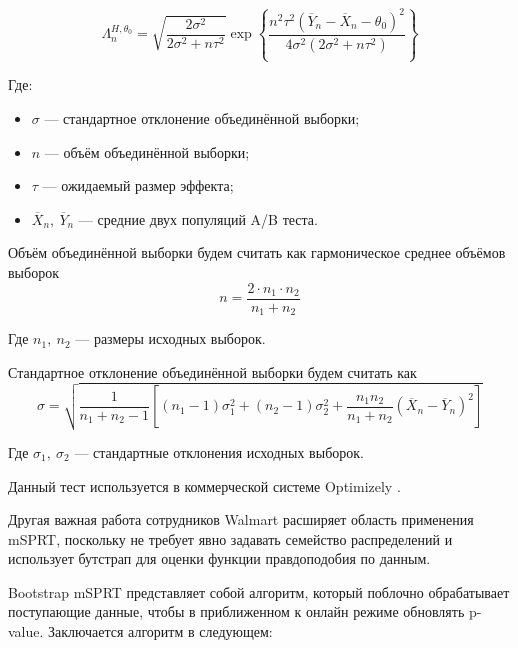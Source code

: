 \documentclass[../document.tex]{subfiles}
\begin{document}
	\begin{equation}
		\Lambda_{n}^{H,\theta_0} = \sqrt{\frac{2\sigma^2}{2\sigma^2 +n\tau^2}} \exp\left\{\frac{n^2\tau^2 (\overline{Y}_n-\overline{X}_n-\theta_0)^2}{4\sigma^2(2\sigma^2+n\tau^2)}\right\}
	\end{equation}
	\par Где:
	\begin{itemize}
		\item $\sigma$ --- стандартное отклонение объединённой выборки;
		\item $n$ --- объём объединённой выборки;
		\item $\tau$ --- ожидаемый размер эффекта;
		\item $\overline{X}_n,\ \overline{Y}_n$ --- средние двух популяций A/B теста.
	\end{itemize}
	\par Объём объединённой выборки будем считать как гармоническое среднее объёмов выборок \cite{welch_robust}
	\begin{equation}
		n=\frac{2\cdot n_1\cdot n_2}{n_1+n_2}
	\end{equation}
	\par Где $n_1,\ n_2$ --- размеры исходных выборок.
	\par Стандартное отклонение объединённой выборки будем считать как \cite{neil_sampling}
	\begin{equation}
		\sigma = \sqrt{\frac{1}{n_1+n_2-1}\left[(n_1-1)\sigma_1^2+(n_2-1)\sigma_2^2 +\frac{n_1 n_2}{n_1+n_2}(\overline{X}_n - \overline{Y}_n)^2\right]}
	\end{equation}
	\par Где $\sigma_1,\ \sigma_2$ --- стандартные отклонения исходных выборок.
	\par Данный тест используется в коммерческой системе Optimizely \cite{optimizely}.
	\par Другая важная работа \cite{bootstrap_msprt} сотрудников Walmart расширяет область применения mSPRT, поскольку не требует явно задавать семейство распределений и использует бутстрап для оценки функции правдоподобия по данным.
	\par Bootstrap mSPRT представляет собой алгоритм, который поблочно обрабатывает поступающие данные, чтобы в приближенном к онлайн режиме обновлять p-value. Заключается алгоритм в следующем:
\end{document}
